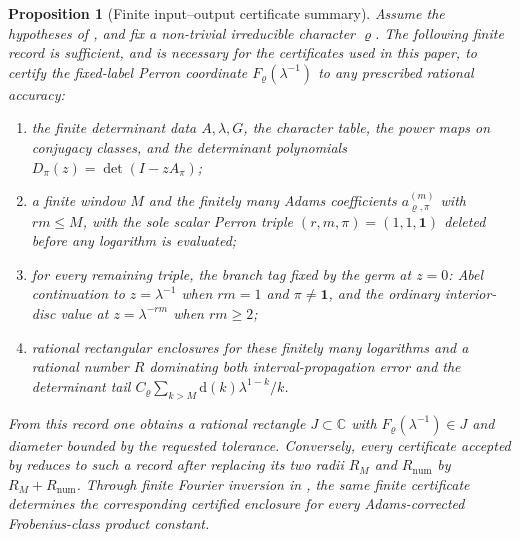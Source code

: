 \documentclass[11pt,a4paper]{amsart}
\theoremstyle{plain}
\newtheorem{proposition}[theorem]{Proposition}
\theoremstyle{definition}
\theoremstyle{remark}
\newcommand{\CC}{\mathbb{C}}
\begin{document}
\begin{proposition}[Finite input--output certificate summary]
  \label{prop:fixed-label-finite-io-certificate-summary}
  Assume the hypotheses of , and fix a
  non-trivial irreducible character \(\varrho\).  The following finite record is
  sufficient, and is necessary for the certificates used in this paper, to
  certify the fixed-label Perron coordinate
  \(F_\varrho(\lambda^{-1})\) to any prescribed rational accuracy:
  \begin{enumerate}[label=\textup{(\roman*)},leftmargin=*]
    \item the finite determinant data
      \(A,\lambda,G\), the character table, the power maps on conjugacy
      classes, and the determinant polynomials
      \(D_\pi(z)=\det(I-zA_\pi)\);
    \item a finite window \(M\) and the finitely many Adams coefficients
      \(a_{\varrho,
      \pi}^{(m)}\) with \(rm\le M\), with the sole scalar Perron triple
      \((r,m,\pi)=(1,1,\mathbf1)\) deleted before any logarithm is evaluated;
    \item for every remaining triple, the branch tag fixed by the germ at
      \(z=0\): Abel continuation to \(z=\lambda^{-1}\) when
      \(rm=1\) and \(\pi\ne\mathbf1\), and the ordinary interior-disc value at
      \(z=\lambda^{-rm}\) when \(rm\ge2\);
    \item rational rectangular enclosures for these finitely many logarithms
      and a rational number \(R\) dominating both interval-propagation error
      and the determinant tail
      \(C_\varrho\sum_{k>M}\mathrm d(k)\lambda^{1-k}/k\).
  \end{enumerate}
  From this record one obtains a rational rectangle \(J\subset\CC\) with
  \(F_\varrho(\lambda^{-1})\in J\) and diameter bounded by the requested
  tolerance.  Conversely, every certificate accepted by
   reduces to such a record after
  replacing its two radii \(R_M\) and \(R_{\mathrm{num}}\) by
  \(R_M+R_{\mathrm{num}}\).  Through finite Fourier inversion in
  ,
  the same finite certificate determines the corresponding certified enclosure
  for every Adams-corrected Frobenius-class product constant.
\end{proposition}
\end{document}
